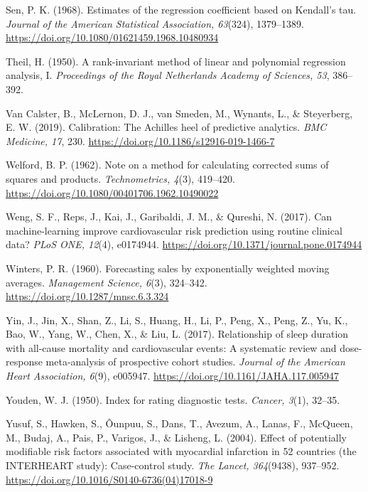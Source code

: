 \documentclass[12pt,letterpaper]{article}
\begin{document}
\begin{enumerate}[label={[\arabic*]}, leftmargin=2.2em]
\item Sen, P. K. (1968). Estimates of the regression coefficient based on
Kendall's tau. \textit{Journal of the American Statistical Association,
63}(324), 1379--1389. \url{https://doi.org/10.1080/01621459.1968.10480934}

\item Theil, H. (1950). A rank-invariant method of linear and polynomial
regression analysis, I. \textit{Proceedings of the Royal Netherlands Academy of
Sciences, 53}, 386--392.

\item Van Calster, B., McLernon, D. J., van Smeden, M., Wynants, L., \&
Steyerberg, E. W. (2019). Calibration: The Achilles heel of predictive
analytics. \textit{BMC Medicine, 17}, 230.
\url{https://doi.org/10.1186/s12916-019-1466-7}

\item Welford, B. P. (1962). Note on a method for calculating corrected sums of
squares and products. \textit{Technometrics, 4}(3), 419--420.
\url{https://doi.org/10.1080/00401706.1962.10490022}

\item Weng, S. F., Reps, J., Kai, J., Garibaldi, J. M., \& Qureshi, N. (2017).
Can machine-learning improve cardiovascular risk prediction using routine
clinical data? \textit{PLoS ONE, 12}(4), e0174944.
\url{https://doi.org/10.1371/journal.pone.0174944}

\item Winters, P. R. (1960). Forecasting sales by exponentially weighted moving
averages. \textit{Management Science, 6}(3), 324--342.
\url{https://doi.org/10.1287/mnsc.6.3.324}

\item Yin, J., Jin, X., Shan, Z., Li, S., Huang, H., Li, P., Peng, X., Peng, Z.,
Yu, K., Bao, W., Yang, W., Chen, X., \& Liu, L. (2017). Relationship of sleep
duration with all-cause mortality and cardiovascular events: A systematic review
and dose-response meta-analysis of prospective cohort studies. \textit{Journal
of the American Heart Association, 6}(9), e005947.
\url{https://doi.org/10.1161/JAHA.117.005947}

\item Youden, W. J. (1950). Index for rating diagnostic tests. \textit{Cancer,
3}(1), 32--35.

\item Yusuf, S., Hawken, S., Ôunpuu, S., Dans, T., Avezum, A., Lanas, F.,
McQueen, M., Budaj, A., Pais, P., Varigos, J., \& Lisheng, L. (2004). Effect of
potentially modifiable risk factors associated with myocardial infarction in 52
countries (the INTERHEART study): Case-control study. \textit{The Lancet,
364}(9438), 937--952. \url{https://doi.org/10.1016/S0140-6736(04)17018-9}


\end{enumerate}
\end{document}
